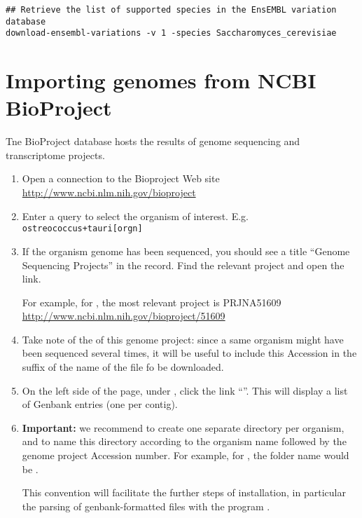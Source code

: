 \begin{lstlisting}
## Retrieve the list of supported species in the EnsEMBL variation database
download-ensembl-variations -v 1 -species Saccharomyces_cerevisiae
\end{lstlisting}

\section{Importing genomes from NCBI BioProject}

Tne BioProject database hosts the results of genome sequencing and
transcriptome projects. 

\begin{enumerate}
\item Open a connection to the Bioproject Web site \\
  \url{http://www.ncbi.nlm.nih.gov/bioproject}

\item Enter a query to select the organism of interest.
  E.g. \texttt{ostreococcus+tauri[orgn]}

\item If the organism genome has been sequenced, you should see a
  title ``Genome Sequencing Projects'' in the record. Find the
  relevant project and open the link.

  For example, for
  , the most relevant project is PRJNA51609 \\
  \url{http://www.ncbi.nlm.nih.gov/bioproject/51609}

\item Take note of the  of this genome project:
  since a same organism might have been sequenced several times, it
  will be useful to include this Accession in the suffix of the name
  of the file fo be downloaded.

\item On the left side of the page, under , click the link ``''. This will display a list of Genbank entries (one per contig).

\item \textbf{Important:} we recommend to create one separate
  directory per organism, and to name this directory according to the
  organism name followed by the genome project Accession number. For
  example, for , the folder name would be
  .

  This convention will facilitate the further steps of installation,
  in particular the parsing of genbank-formatted files with the
  program .


\end{enumerate}
